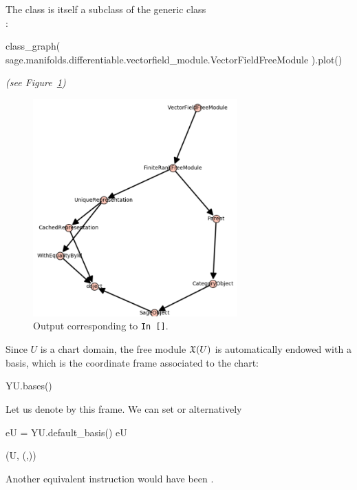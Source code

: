 The class  is itself a subclass
of the generic class\\ :
\begin{NBin}
class_graph(
  sage.manifolds.differentiable.vectorfield_module.VectorFieldFreeModule
).plot()
\end{NBin}
\begin{NBout}
\emph{(see Figure~\ref{out3})}
\end{NBout}
\begin{figure}
\includegraphics[width=0.7\textwidth]{vfmodule_class.png}
\caption{Output corresponding to \texttt{In [\theNBin]}.}\label{out3}
\end{figure}

Since $U$ is a chart domain, the free module $\mathfrak{X}(U)$ is automatically endowed with a basis,
which is the coordinate frame associated to the chart:
\begin{NBin}
YU.bases()
\end{NBin}
\begin{NBoutM}
\end{NBoutM}
Let us denote by  this frame. We can set  or
alternatively
\begin{NBin}
eU = YU.default_basis()
eU
\end{NBin}
\begin{NBoutM}
\left(U, \left(,\right)\right)
\end{NBoutM}
Another equivalent instruction would have been .

